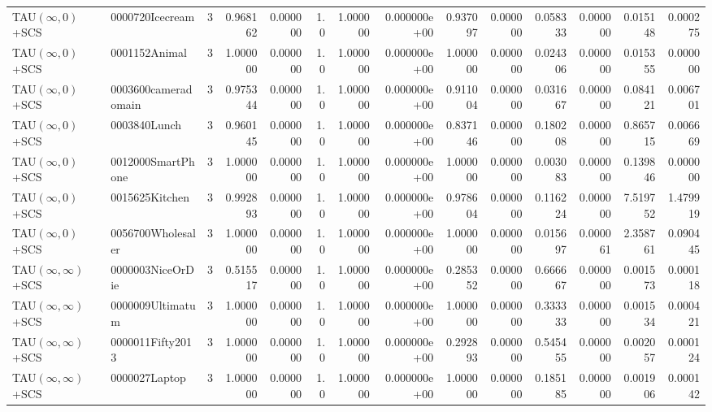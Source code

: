 \begin{tabular}{llrr|r|rr|rr|rr|rrr}
     TAU$(\infty, 0)$+SCS &        0000720Icecream &       3 & 0.968162 & 0.000000 &  1.0 &      1.000000 & 0.000000e+00 &      0.937097 & 0.000000 &      0.058333 &    0.000000 &     0.015148 &    0.000275 \\
     TAU$(\infty, 0)$+SCS &          0001152Animal &       3 & 1.000000 & 0.000000 &  1.0 &      1.000000 & 0.000000e+00 &      1.000000 & 0.000000 &      0.024306 &    0.000000 &     0.015355 &    0.000000 \\
     TAU$(\infty, 0)$+SCS &    0003600cameradomain &       3 & 0.975344 & 0.000000 &  1.0 &      1.000000 & 0.000000e+00 &      0.911004 & 0.000000 &      0.031667 &    0.000000 &     0.084121 &    0.006701 \\
     TAU$(\infty, 0)$+SCS &           0003840Lunch &       3 & 0.960145 & 0.000000 &  1.0 &      1.000000 & 0.000000e+00 &      0.837146 & 0.000000 &      0.180208 &    0.000000 &     0.865715 &    0.006669 \\
     TAU$(\infty, 0)$+SCS &      0012000SmartPhone &       3 & 1.000000 & 0.000000 &  1.0 &      1.000000 & 0.000000e+00 &      1.000000 & 0.000000 &      0.003083 &    0.000000 &     0.139846 &    0.000000 \\
     TAU$(\infty, 0)$+SCS &         0015625Kitchen &       3 & 0.992893 & 0.000000 &  1.0 &      1.000000 & 0.000000e+00 &      0.978604 & 0.000000 &      0.116224 &    0.000000 &     7.519752 &    1.479919 \\
     TAU$(\infty, 0)$+SCS &      0056700Wholesaler &       3 & 1.000000 & 0.000000 &  1.0 &      1.000000 & 0.000000e+00 &      1.000000 & 0.000000 &      0.015697 &    0.000061 &     2.358761 &    0.090445 \\
TAU$(\infty, \infty)$+SCS &       0000003NiceOrDie &       3 & 0.515517 & 0.000000 &  1.0 &      1.000000 & 0.000000e+00 &      0.285352 & 0.000000 &      0.666667 &    0.000000 &     0.001573 &    0.000118 \\
TAU$(\infty, \infty)$+SCS &       0000009Ultimatum &       3 & 1.000000 & 0.000000 &  1.0 &      1.000000 & 0.000000e+00 &      1.000000 & 0.000000 &      0.333333 &    0.000000 &     0.001534 &    0.000421 \\
TAU$(\infty, \infty)$+SCS &       0000011Fifty2013 &       3 & 1.000000 & 0.000000 &  1.0 &      1.000000 & 0.000000e+00 &      0.292893 & 0.000000 &      0.545455 &    0.000000 &     0.002057 &    0.000124 \\
TAU$(\infty, \infty)$+SCS &          0000027Laptop &       3 & 1.000000 & 0.000000 &  1.0 &      1.000000 & 0.000000e+00 &      1.000000 & 0.000000 &      0.185185 &    0.000000 &     0.001906 &    0.000142 \\

\end{tabular}
